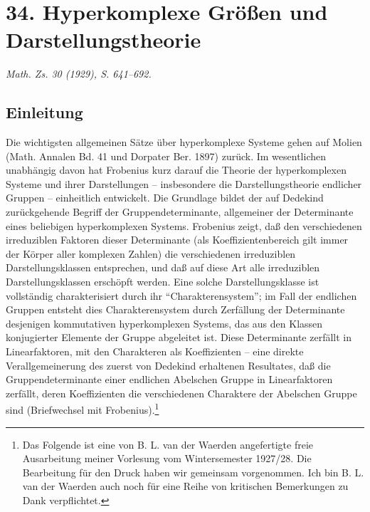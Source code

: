 \documentclass[11pt]{article}
\providecommand{\mG}{\mathfrak{G}}
\providecommand{\mA}{\mathfrak{A}}
\providecommand{\mB}{\mathfrak{B}}
\providecommand{\mC}{\mathfrak{C}}
\providecommand{\mD}{\mathfrak{D}}
\providecommand{\mE}{\mathfrak{E}}
\providecommand{\mH}{\mathfrak{H}}
\providecommand{\mK}{\mathfrak{K}}
\providecommand{\mM}{\mathfrak{M}}
\providecommand{\mN}{\mathfrak{N}}
\providecommand{\mR}{\mathfrak{R}}
\providecommand{\mS}{\mathfrak{S}}
\providecommand{\mT}{\mathfrak{T}}
\providecommand{\mU}{\mathfrak{U}}
\providecommand{\mO}{\mathfrak{O}}
\providecommand{\mo}{\mathfrak{o}}
\providecommand{\OO}{\Omega}
\providecommand{\Th}{\Theta}
\newcommand{\iso}{\simeq}
\newcommand{\normlhd}{\triangleleft}
\begin{document}
\providecommand{\mG}{\mathfrak{G}}
\providecommand{\mA}{\mathfrak{A}}
\providecommand{\mB}{\mathfrak{B}}
\providecommand{\mC}{\mathfrak{C}}
\providecommand{\mD}{\mathfrak{D}}
\providecommand{\mE}{\mathfrak{E}}
\providecommand{\mH}{\mathfrak{H}}
\providecommand{\mK}{\mathfrak{K}}
\providecommand{\mM}{\mathfrak{M}}
\providecommand{\mN}{\mathfrak{N}}
\providecommand{\mR}{\mathfrak{R}}
\providecommand{\mS}{\mathfrak{S}}
\providecommand{\mT}{\mathfrak{T}}
\providecommand{\mU}{\mathfrak{U}}
\providecommand{\mO}{\mathfrak{O}}
\providecommand{\mo}{\mathfrak{o}}
\providecommand{\OO}{\Omega}
\providecommand{\Th}{\Theta}
\providecommand{\iso}{\simeq}
\providecommand{\normlhd}{\triangleleft}

\setcounter{footnote}{0}

\section*{34. Hyperkomplexe Größen und Darstellungstheorie}
\emph{Math. Zs. 30 (1929), S. 641--692.}

\subsection*{Einleitung}

Die wichtigsten allgemeinen Sätze über hyperkomplexe Systeme gehen auf Molien (Math. Annalen Bd. 41 und Dorpater Ber. 1897) zurück. Im wesentlichen unabhängig davon hat Frobenius kurz darauf die Theorie der hyperkomplexen Systeme und ihrer Darstellungen -- insbesondere die Darstellungstheorie endlicher Gruppen -- einheitlich entwickelt. Die Grundlage bildet der auf Dedekind zurückgehende Begriff der Gruppendeterminante, allgemeiner der Determinante eines beliebigen hyperkomplexen Systems. Frobenius zeigt, daß den verschiedenen irreduziblen Faktoren dieser Determinante (als Koeffizientenbereich gilt immer der Körper aller komplexen Zahlen) die verschiedenen irreduziblen Darstellungsklassen entsprechen, und daß auf diese Art alle irreduziblen Darstellungsklassen erschöpft werden. Eine solche Darstellungsklasse ist vollständig charakterisiert durch ihr ``Charakterensystem''; im Fall der endlichen Gruppen entsteht dies Charakterensystem durch Zerfällung der Determinante desjenigen kommutativen hyperkomplexen Systems, das aus den Klassen konjugierter Elemente der Gruppe abgeleitet ist. Diese Determinante zerfällt in Linearfaktoren, mit den Charakteren als Koeffizienten -- eine direkte Verallgemeinerung des zuerst von Dedekind erhaltenen Resultates, daß die Gruppendeterminante einer endlichen Abelschen Gruppe in Linearfaktoren zerfällt, deren Koeffizienten die verschiedenen Charaktere der Abelschen Gruppe sind (Briefwechsel mit Frobenius).\footnote{Das Folgende ist eine von B. L. van der Waerden angefertigte freie Ausarbeitung meiner Vorlesung vom Wintersemester 1927/28. Die Bearbeitung für den Druck haben wir gemeinsam vorgenommen. Ich bin B. L. van der Waerden auch noch für eine Reihe von kritischen Bemerkungen zu Dank verpflichtet.}
\end{document}
